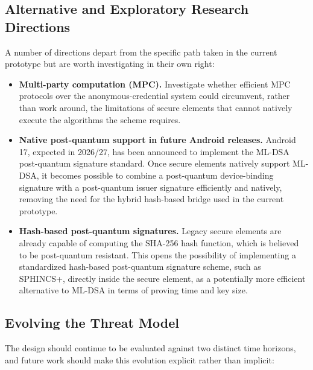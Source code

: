 \documentclass{article}
\begin{document}
\subsection{Alternative and Exploratory Research Directions}

A number of directions depart from the specific path taken in the current prototype but are worth investigating in their own right:

\begin{itemize}
    \item \textbf{Multi-party computation (MPC).} Investigate whether efficient MPC protocols over the anonymous-credential system could circumvent, rather than work around, the limitations of secure elements that cannot natively execute the algorithms the scheme requires.
    \item \textbf{Native post-quantum support in future Android releases.} Android 17, expected in 2026/27, has been announced to implement the ML-DSA post-quantum signature standard. Once secure elements natively support ML-DSA, it becomes possible to combine a post-quantum device-binding signature with a post-quantum issuer signature efficiently and natively, removing the need for the hybrid hash-based bridge used in the current prototype.
    \item \textbf{Hash-based post-quantum signatures.} Legacy secure elements are already capable of computing the SHA-256 hash function, which is believed to be post-quantum resistant. This opens the possibility of implementing a standardized hash-based post-quantum signature scheme, such as SPHINCS+, directly inside the secure element, as a potentially more efficient alternative to ML-DSA in terms of proving time and key size.
\end{itemize}

\subsection{Evolving the Threat Model}

The design should continue to be evaluated against two distinct time horizons, and future work should make this evolution explicit rather than implicit:
\end{document}
